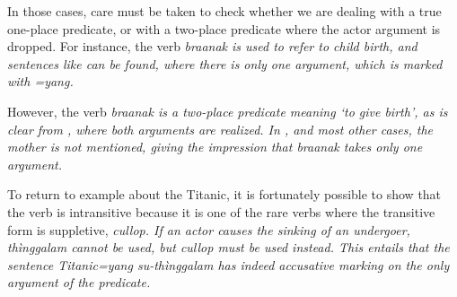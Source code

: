 
In those cases, care must be taken to check whether we are dealing with a true one-place predicate, or with a two-place predicate where the actor argument is dropped. For instance, the verb \em braanak \em is used to refer to child birth, and sentences like  can be found, where there is only one argument, which is marked with \em =yang\em.




However, the verb \em braanak \em is a two-place predicate meaning `to give birth', as is clear from , where both arguments are realized. In , and most other cases, the mother is not mentioned, giving the impression that \em braanak \em takes only one argument.


To return to example  about the Titanic, it is fortunately possible to show that the verb  is intransitive because it is one of the rare verbs where the transitive form is suppletive, \em cullop\em. If an actor causes the sinking of an undergoer, \em thìnggalam \em cannot be used, but \em cullop \em must be used instead. This entails that the sentence \em Titanic=yang su-thìnggalam \em has indeed accusative marking on the only argument of the predicate.
% 
% 
% 
% 
% 
% 
% 

